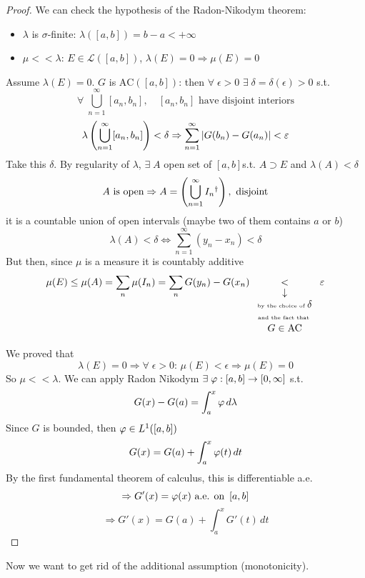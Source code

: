 \begin{proof}
We can check the hypothesis of the Radon-Nikodym theorem:
\begin{itemize}
    \item \(\lambda\) is \(\sigma\)-finite: \(\lambda([a,b]) = b-a < +\infty\)
    \item \(\mu << \lambda\): \(E \in \mathcal{L}([a,b])\), \(\lambda(E) = 0 \Rightarrow \mu(E) = 0\)
\end{itemize}
Assume \(\lambda(E) = 0\). \(G\) is \(\mbox{AC}([a,b])\): then \(\forall \; \epsilon > 0\) \(\exists \; \delta = \delta(\epsilon) > 0\) s.t. 
\[
    \forall \; \bigcup_{n=1}^{\infty} [a_n, b_n], \quad [a_n, b_n] \mbox{ have disjoint interiors}
\]
\[
    \lambda\left(\bigcup_{n=1}^{\infty} [a_n, b_n]\right) < \delta \Rightarrow \sum_{n=1}^{\infty} \abs{G(b_n) - G(a_n)} < \epsilon
\]
Take this \(\delta\). By regularity of \(\lambda\), \(\exists \; A \) open set of \(\left[a, b\right]\)s.t. \(A \supset E\) and \(\lambda(A) < \delta\)
\[
    A \mbox{ is open} \Rightarrow A = \left( \bigcup_{n=1}^{\infty} I_n \symbolfootnotemark[2]{\mbox{open intervals } = (x, y)} \right), \mbox{ disjoint}
    \symbolfootnotetext[2]{open intervals = \((x_n, y_n)\)}
\] 
it is a countable union of open intervals (maybe two of them contains \(a\) or \(b\))
\[
    \lambda(A) < \delta \Leftrightarrow \sum_{n=1}^{\infty} (y_n - x_n) < \delta
\]
But then, since \(\mu\) is a measure it is countably additive
\[
    \mu (E) \leq \mu(A) = \sum_n \mu (I_n) = \sum_n G(y_n) - G(x_n) \underset{\begin{array}{c} \downarrow \\ \text{\tiny{by the choice of }} \delta \\ \text{\tiny{and the fact that }} \\G \in \text{AC}\end{array}}{<} \epsilon
\]

We proved that 
\[
    \lambda(E) = 0 \Rightarrow \forall \; \epsilon >0 : \, \mu(E) < \epsilon \Rightarrow \mu(E) =0
\]
So \(\mu << \lambda\). We can apply Radon Nikodym \(\exists \; \oldphi : \left[ a, b\right] \to \left[0, \infty\right]\) s.t. 
\[
    G(x) - G(a) = \int_a^x \oldphi \, d\lambda
\]
Since \(G\) is bounded, then \(\oldphi \in L^1(\left[a, b\right])\)
\[
    G(x)=G(a) + \int_a^x \oldphi(t) \, dt
\]
By the first fundamental theorem of calculus, this is differentiable a.e. 
\[
    \Rightarrow G'(x) = \oldphi(x) \text{ a.e. on } \left[a, b\right]
\]
\[
    \Rightarrow G'(x) = G(a) + \int_a^x G'(t) \, dt
\]
\end{proof}
Now we want to get rid of the additional assumption (monotonicity).

